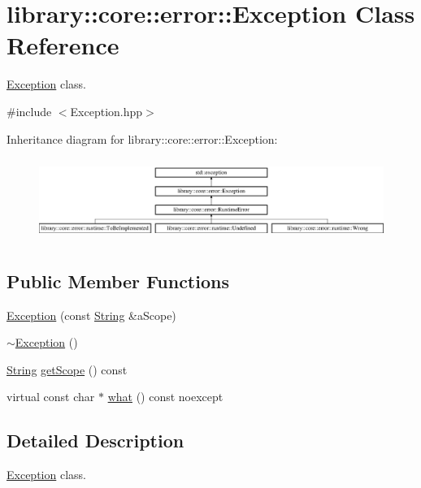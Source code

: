 \hypertarget{classlibrary_1_1core_1_1error_1_1Exception}{}\section{library\+:\+:core\+:\+:error\+:\+:Exception Class Reference}
\label{classlibrary_1_1core_1_1error_1_1Exception}


\hyperlink{classlibrary_1_1core_1_1error_1_1Exception}{Exception} class.  




{\ttfamily \#include $<$Exception.\+hpp$>$}

Inheritance diagram for library\+:\+:core\+:\+:error\+:\+:Exception\+:\begin{figure}[H]
\begin{center}
\leavevmode
\includegraphics[height=2.715152cm]{classlibrary_1_1core_1_1error_1_1Exception}
\end{center}
\end{figure}
\subsection*{Public Member Functions}
\begin{DoxyCompactItemize}
\item 
\hyperlink{classlibrary_1_1core_1_1error_1_1Exception_a8e0c32779ff9a01d992d810848c841b7}{Exception} (const \hyperlink{classlibrary_1_1core_1_1types_1_1String}{String} \&a\+Scope)
\item 
\hyperlink{classlibrary_1_1core_1_1error_1_1Exception_a2fc342415e921c6037465806d278d7d0}{$\sim$\+Exception} ()
\item 
\hyperlink{classlibrary_1_1core_1_1types_1_1String}{String} \hyperlink{classlibrary_1_1core_1_1error_1_1Exception_a9c20da352aa0785b837b43cd52d09500}{get\+Scope} () const
\item 
virtual const char $\ast$ \hyperlink{classlibrary_1_1core_1_1error_1_1Exception_ab318a927162519b15961ca66be07fd6b}{what} () const noexcept
\end{DoxyCompactItemize}


\subsection{Detailed Description}
\hyperlink{classlibrary_1_1core_1_1error_1_1Exception}{Exception} class. 

